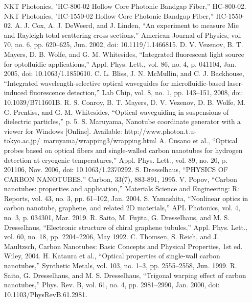 \begin{thebibliography}{99}
NKT Photonics, "HC-800-02 Hollow Core Photonic Bandgap Fiber,” HC-800-02.
NKT Photonics, "HC-1550-02 Hollow Core Photonic Bandgap Fiber,” HC-1550-02.
A. J. Cox, A. J. DeWeerd, and J. Linden, “An experiment to measure Mie and Rayleigh total scattering cross sections,” American Journal of Physics, vol. 70, no. 6, pp. 620–625, Jun. 2002, doi: 10.1119/1.1466815.
D. V. Vezenov, B. T. Mayers, D. B. Wolfe, and G. M. Whitesides, “Integrated fluorescent light source for optofluidic applications,” Appl. Phys. Lett., vol. 86, no. 4, p. 041104, Jan. 2005, doi: 10.1063/1.1850610.
C. L. Bliss, J. N. McMullin, and C. J. Backhouse, “Integrated wavelength-selective optical waveguides for microfluidic-based laser-induced fluorescence detection,” Lab Chip, vol. 8, no. 1, pp. 143–151, 2008, doi: 10.1039/B711601B.
R. S. Conroy, B. T. Mayers, D. V. Vezenov, D. B. Wolfe, M. G. Prentiss, and G. M. Whitesides, “Optical waveguiding in suspensions of dielectric particles,” p. 5.
 S. Maruyama, Nanotube coordinate generator with a viewer for Windows [Online]. Available: http://www.photon.t.u-tokyo.ac.jp/~maruyama/wrapping3/wrapping.html
A. Cusano et al., “Optical probes based on optical fibers and single-walled carbon nanotubes for hydrogen detection at cryogenic temperatures,” Appl. Phys. Lett., vol. 89, no. 20, p. 201106, Nov. 2006, doi: 10.1063/1.2370292.
 S. Dresselhaus, “PHYSICS OF CARBON NANOTUBES,” Carbon, 33(7), 883-891, 1995.
 V. Popov, “Carbon nanotubes: properties and application,” Materials Science and Engineering: R: Reports, vol. 43, no. 3, pp. 61–102, Jan. 2004.
 S. Yamashita, “Nonlinear optics in carbon nanotube, graphene, and related 2D materials,” APL Photonics, vol. 4, no. 3, p. 034301, Mar. 2019.
R. Saito, M. Fujita, G. Dresselhaus, and M. S. Dresselhaus, “Electronic structure of chiral graphene tubules,” Appl. Phys. Lett., vol. 60, no. 18, pp. 2204–2206, May 1992.
C. Thomsen, S. Reich, and J. Maultzsch, Carbon Nanotubes: Basic Concepts and Physical Properties, 1st ed. Wiley, 2004. 
 H. Kataura et al., “Optical properties of single-wall carbon nanotubes,” Synthetic Metals, vol. 103, no. 1–3, pp. 2555–2558, Jun. 1999.
 R. Saito, G. Dresselhaus, and M. S. Dresselhaus, “Trigonal warping effect of carbon nanotubes,” Phys. Rev. B, vol. 61, no. 4, pp. 2981–2990, Jan. 2000, doi: 10.1103/PhysRevB.61.2981.

\end{thebibliography}
